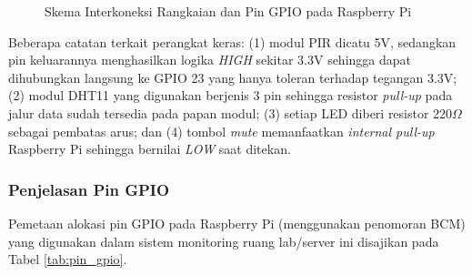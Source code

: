 \documentclass[12pt, a4paper]{article}
\begin{document}
\begin{figure}[h!]
{%
}
\caption{Skema Interkoneksi Rangkaian dan Pin GPIO pada Raspberry Pi}
\label{fig:skema_rangkaian}
\end{figure}
\vspace{0.2cm}

Beberapa catatan terkait perangkat keras: (1) modul PIR dicatu 5V, sedangkan pin keluarannya menghasilkan logika \textit{HIGH} sekitar 3.3V sehingga dapat dihubungkan langsung ke GPIO 23 yang hanya toleran terhadap tegangan 3.3V; (2) modul DHT11 yang digunakan berjenis 3 pin sehingga resistor \textit{pull-up} pada jalur data sudah tersedia pada papan modul; (3) setiap LED diberi resistor 220$\Omega$ sebagai pembatas arus; dan (4) tombol \textit{mute} memanfaatkan \textit{internal pull-up} Raspberry Pi sehingga bernilai \textit{LOW} saat ditekan.


\subsubsection{Penjelasan Pin GPIO}
Pemetaan alokasi pin GPIO pada Raspberry Pi (menggunakan penomoran BCM) yang digunakan dalam sistem monitoring ruang 
lab/server ini disajikan pada Tabel \ref{tab:pin_gpio}.
\end{document}
